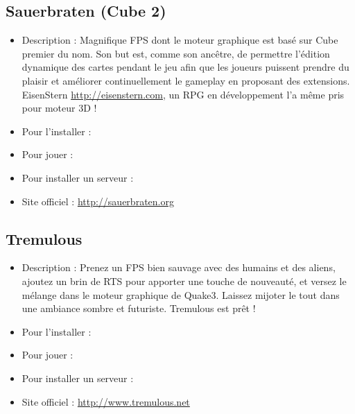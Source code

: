 \subsection{Sauerbraten (Cube 2)}
\begin{itemize}
\begingroup
{}
\item Description : Magnifique FPS dont le moteur graphique est basé sur Cube premier du nom. Son but est, comme son ancêtre, de permettre l'édition dynamique des cartes pendant le jeu afin que les joueurs puissent prendre du plaisir et améliorer continuellement le gameplay en proposant des extensions. EisenStern \url{http://eisenstern.com}, un RPG  en développement l'a même pris pour moteur 3D !{\par}
\endgroup
\item Pour l'installer : 
\item Pour jouer : 
\item Pour installer un serveur : 
\item Site officiel : \url{http://sauerbraten.org}{\par}
\end{itemize}
\subsection{Tremulous}
\begin{itemize}
\begingroup
{}
\item Description : Prenez un FPS bien sauvage avec des humains et des aliens, ajoutez un brin de RTS pour apporter une touche de nouveauté, et versez le mélange dans le moteur graphique de Quake3. Laissez mijoter le tout dans une ambiance sombre et futuriste. Tremulous est prêt !{\par}
\endgroup
\item Pour l'installer : 
\item Pour jouer : 
\item Pour installer un serveur : 
\item Site officiel : \url{http://www.tremulous.net}{\par}
\end{itemize}
